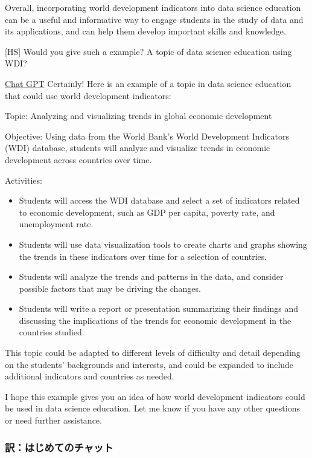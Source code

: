 \documentclass[
]{bxjsbook}
\providecommand{\tightlist}{%
  \setlength{\itemsep}{0pt}\setlength{\parskip}{0pt}}
\theoremstyle{definition}
\theoremstyle{definition}
\theoremstyle{definition}
\theoremstyle{definition}
\theoremstyle{remark}
\begin{document}
Overall, incorporating world development indicators into data science education can be a useful and informative way to engage students in the study of data and its applications, and can help them develop important skills and knowledge.

{[}HS{]} Would you give such a example? A topic of data science education using WDI?

\protect\hyperlink{chatgpt}{Chat GPT} Certainly! Here is an example of a topic in data science education that could use world development indicators:

Topic: Analyzing and visualizing trends in global economic development

Objective: Using data from the World Bank's World Development Indicators (WDI) database, students will analyze and visualize trends in economic development across countries over time.

Activities:

\begin{itemize}
\tightlist
\item
  Students will access the WDI database and select a set of indicators related to economic development, such as GDP per capita, poverty rate, and unemployment rate.
\item
  Students will use data visualization tools to create charts and graphs showing the trends in these indicators over time for a selection of countries.
\item
  Students will analyze the trends and patterns in the data, and consider possible factors that may be driving the changes.
\item
  Students will write a report or presentation summarizing their findings and discussing the implications of the trends for economic development in the countries studied.
\end{itemize}

This topic could be adapted to different levels of difficulty and detail depending on the students' backgrounds and interests, and could be expanded to include additional indicators and countries as needed.

I hope this example gives you an idea of how world development indicators could be used in data science education. Let me know if you have any other questions or need further assistance.

\hypertarget{firstchatj}{%
\subsubsection{訳：はじめてのチャット}\label{firstchatj}}
\end{document}
